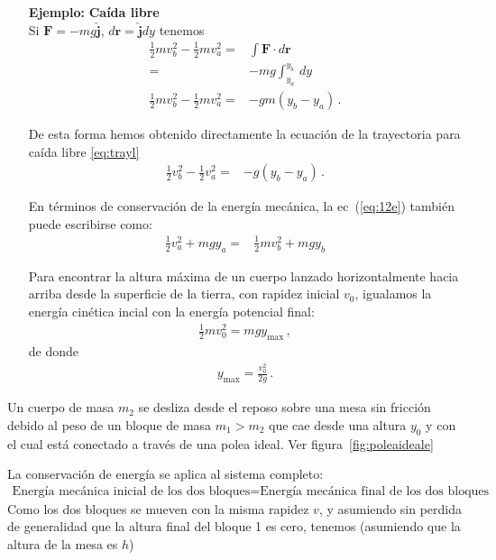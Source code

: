 \begin{itemize}
\item[\textbf{Ejemplo:}] \textbf{Caída libre}\\
Si $\mathbf{F}=-mg\hat{\mathbf{j}}$, $d\mathbf{r}=\hat{\mathbf{j}}dy$ tenemos
\begin{align}
\label{eq:12e}
  \tfrac{1}{2}mv_b^2-\tfrac{1}{2}mv_a^2=&\int\mathbf{F}\cdot d\mathbf{r}\nonumber\\
  =&-mg \int_{y_a}^{y_b}\, dy\nonumber\\
  \tfrac{1}{2}mv_b^2-\tfrac{1}{2}mv_a^2=&-gm(y_b-y_a)\,.
\end{align}

De esta forma hemos obtenido directamente la ecuación de la trayectoria para caída libre \eqref{eq:trayl}
\begin{align}
  \tfrac{1}{2}v_b^2-\tfrac{1}{2}v_a^2=&-g(y_b-y_a)\,.
\end{align}

En términos de conservación de la energía mecánica, la ec~(\ref{eq:12e}) también puede escribirse como:
\begin{align}
  \tfrac{1}{2}v_a^2+mgy_a=&\tfrac{1}{2}mv_b^2+mgy_b
\end{align}


Para encontrar la altura máxima de un cuerpo lanzado horizontalmente hacia arriba desde la superficie de la tierra, con rapidez inicial $v_0$, igualamos la energía cinética incial con la energía potencial final:
\begin{align}
  \frac{1}{2}mv_0^2=mgy_{\text{max}}\,,
\end{align}
de donde
\begin{align}
  y_{\text{max}}=\frac{v_0^2}{2g}\,.
\end{align}

\end{itemize}


\example{}
\label{ex:polea}


 Un cuerpo de masa $m_2$ se desliza desde el
  reposo sobre una mesa sin fricción debido al peso de un bloque de
  masa $m_1>m_2$ que cae desde una altura $y_0$ y con el cual está
  conectado a través de una polea ideal. Ver figura~\ref{fig:poleaideale}

La conservación de energía se aplica al sistema completo:
\begin{align}
  \text{Energía mecánica inicial de los dos bloques}=
\text{Energía mecánica final de los dos bloques}
\end{align}
Como los dos bloques se mueven con la misma rapidez $v$, y asumiendo
sin perdida de generalidad que la altura final del bloque 1 es cero,
tenemos (asumiendo que la altura de la mesa es $h$)

